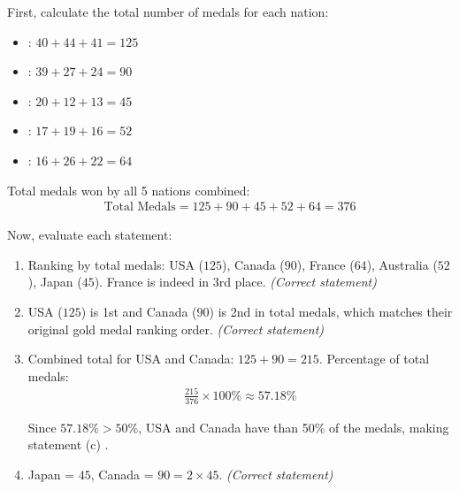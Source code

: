 \begin{enumerate}[label=\thesubsection.\arabic*, ref=\thesubsection.\theenumi]

\solution

First, calculate the total number of medals for each nation:

\begin{itemize}
    \item {}: $40 + 44 + 41 = 125$
    \item {}: $39 + 27 + 24 = 90$
    \item {}: $20 + 12 + 13 = 45$
    \item {}: $17 + 19 + 16 = 52$
    \item {}: $16 + 26 + 22 = 64$
\end{itemize}

Total medals won by all 5 nations combined:
\begin{align}
\text{Total Medals} = 125 + 90 + 45 + 52 + 64 = 376
\end{align}

Now, evaluate each statement:

\begin{enumerate}
    \item[(a)]  
    Ranking by total medals: USA ($125$), Canada ($90$), France ($64$), Australia ($52$), Japan ($45$). 
    France is indeed in 3rd place. \textit{(Correct statement)}

    \item[(b)]  
    USA ($125$) is 1st and Canada ($90$) is 2nd in total medals, which matches their original gold medal ranking order. \textit{(Correct statement)}

    \item[(c)]  
    Combined total for USA and Canada: $125 + 90 = 215$. 
    Percentage of total medals:
    \begin{align}
    \frac{215}{376} \times 100\% \approx 57.18\%
    \end{align}
    
    Since $57.18\% > 50\%$, USA and Canada have  than 50\% of the medals, making statement (c) .

    \item[(d)]  
    Japan = $45$, Canada = $90 = 2 \times 45$. \textit{(Correct statement)}
\end{enumerate}


\end{enumerate}
